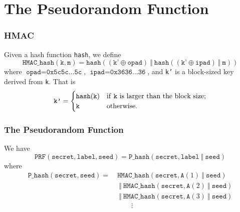 \documentclass[aspectratio=169]{beamer}
\begin{document}
\section{The Pseudorandom Function}
\begin{frame}[Triangle=siiorange]
	\tocpage
\end{frame}

\begin{frame}[triangle=siiblue]
	\frametitle{HMAC}
	Given a hash function \texttt{hash}, we define
	\begin{equation} \nonumber
		\texttt{HMAC\_hash}(\texttt{k}, \texttt{m}) = \texttt{hash}\left((\texttt{k'} \oplus \texttt{opad}) \ \Vert \  \texttt{hash}\left((\texttt{k'} \oplus \texttt{ipad}) \ \Vert \ \texttt{m} \right)\right)
	\end{equation}
	where $\texttt{opad} = \texttt{0x5c5c\ldots 5c}$, $\texttt{ipad} = \texttt{0x3636\ldots 36}$, and \texttt{k'} is a block-sized key derived from \texttt{k}.  That is
	\begin{align*}
		\texttt{k'} &=
		\begin{cases}
			\texttt{hash}(\texttt{k}) & \text{if \texttt{k} is larger than the block size}; \\
			\texttt{k} & \text{otherwise}.
		\end{cases} \\
	\end{align*}
\end{frame}


\begin{frame}[triangle=siiblue]
	\frametitle{The Pseudorandom Function}
	We have
	\begin{equation} \nonumber
		\texttt{PRF}(\texttt{secret}, \texttt{label}, \texttt{seed}) = \texttt{P\_hash}(\texttt{secret}, \texttt{label} \ \Vert \  \texttt{seed})
	\end{equation}
	where
	\begin{equation} \nonumber
	\begin{split}
		\texttt{P\_hash}(\texttt{secret}, \texttt{seed}) = \ &\texttt{HMAC\_hash}(\texttt{secret}, \texttt{A}(1) \ \Vert \  \texttt{seed})\\
		&\ \Vert \ \texttt{HMAC\_hash}(\texttt{secret}, \texttt{A}(2) \ \Vert \  \texttt{seed}) \\
		&\ \Vert \ \texttt{HMAC\_hash}(\texttt{secret}, \texttt{A}(3) \ \Vert \  \texttt{seed}) \\
		&\qquad \vdots
	\end{split}
	\end{equation}
\end{frame}
\end{document}
